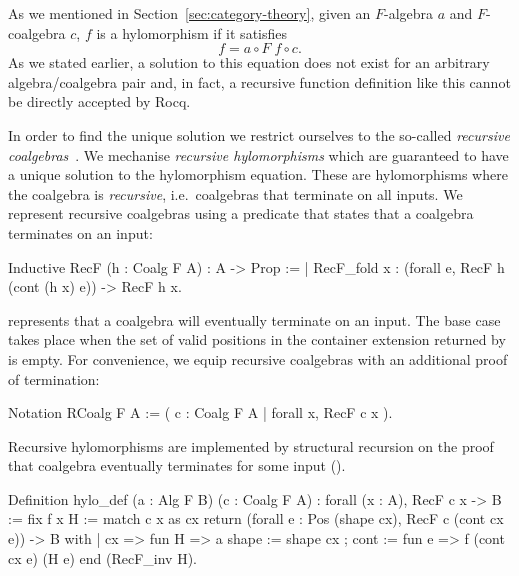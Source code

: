 \documentclass[a4paper,UKenglish,cleveref, autoref, thm-restate]{lipics-v2021}
\begin{document}
As we mentioned in Section~\ref{sec:category-theory}, given an $F$-algebra $a$ and
$F$-coalgebra $c$, $f$ is a hylomorphism if it satisfies
\[
  f = a \circ F\; f \circ c.
\]
As we stated earlier, a solution to this equation does not exist for an
arbitrary  algebra/coalgebra pair and, in fact, a recursive function definition
like this cannot be directly accepted by Rocq.

In order to find the unique solution we restrict ourselves to the so-called
\emph{recursive coalgebras}~\cite{AdamekMM19,CaprettaUV04}.  We mechanise
\emph{recursive hylomorphisms} which are guaranteed to have a unique solution to
the hylomorphism equation. These are hylomorphisms where the coalgebra is
\emph{recursive}, i.e.\ coalgebras that terminate on all inputs. We represent
recursive coalgebras using a predicate that states that a coalgebra terminates
on an input:
\begin{coqcode}
Inductive RecF (h : Coalg F A) : A -> Prop :=
| RecF_fold x : (forall e, RecF h (cont (h x) e)) -> RecF h x.
\end{coqcode}
 represents that a coalgebra will eventually terminate on an input.
The base case takes place when the set of valid positions in the
container extension returned by  is empty.  For convenience, we equip
recursive coalgebras with an additional proof of termination:
\begin{coqcode}
Notation RCoalg F A := ({ c : Coalg F A | forall x, RecF c x }).
\end{coqcode}
Recursive hylomorphisms are implemented by structural recursion on the proof
that coalgebra  eventually terminates for some input 
().
\begin{coqcode}
Definition hylo_def (a : Alg F B) (c : Coalg F A) : forall (x : A), RecF c x -> B
  := fix f x H
     := match c x as cx 
            return (forall e : Pos (shape cx), RecF c (cont cx e)) -> B with
        | cx => fun H => 
            a { shape := shape cx ; cont := fun e => f (cont cx e) (H e) }
        end (RecF_inv H).
\end{coqcode}
\end{document}
